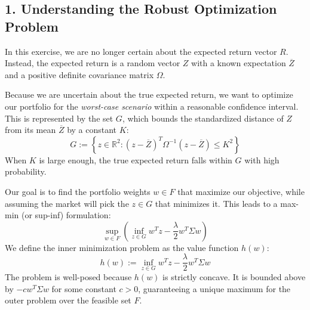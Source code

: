 \subsection*{1. Understanding the Robust Optimization Problem}
In this exercise, we are no longer certain about the expected return vector $R$. Instead, the expected return is a random vector $Z$ with a known expectation $\overline{Z}$ and a positive definite covariance matrix $\Omega$.

Because we are uncertain about the true expected return, we want to optimize our portfolio for the \textit{worst-case scenario} within a reasonable confidence interval. This is represented by the set $G$, which bounds the standardized distance of $Z$ from its mean $\overline{Z}$ by a constant $K$:
\[
G := \left\{ z \in \mathbb{R}^2 : (z - \overline{Z})^T \Omega^{-1} (z - \overline{Z}) \le K^2 \right\}
\]
When $K$ is large enough, the true expected return falls within $G$ with high probability. 

Our goal is to find the portfolio weights $w \in F$ that maximize our objective, while assuming the market will pick the $z \in G$ that minimizes it. This leads to a max-min (or sup-inf) formulation:
\[
\sup_{w \in F} \left( \inf_{z \in G} w^T z - \frac{\lambda}{2}w^T \Sigma w \right)
\]
We define the inner minimization problem as the value function $h(w)$:
\[
h(w) := \inf_{z \in G} w^T z - \frac{\lambda}{2}w^T \Sigma w
\]
The problem is well-posed because $h(w)$ is strictly concave. It is bounded above by $-c w^T \Sigma w$ for some constant $c > 0$, guaranteeing a unique maximum for the outer problem over the feasible set $F$.

